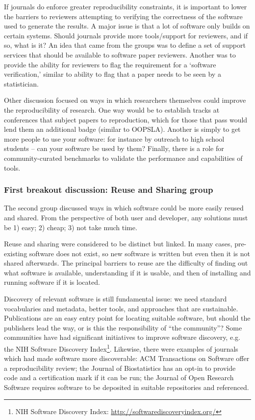 \documentclass[11pt, oneside]{amsart}
\begin{document}
If journals do enforce greater reproducibility constraints, it is important to
lower the barriers to reviewers attempting to verifying the correctness of the
software used to generate the results. A major issue is that a lot of software
only builds on certain systems. Should journals provide more tools/support for
reviewers, and if so, what is it? An idea that came from the groups was to
define a set of support services that should be available to software paper
reviewers. Another was to provide the ability for reviewers to flag the
requirement for a `software verification,' similar to ability to flag that a
paper needs to be seen by a statistician.

Other discussion focused on ways in which researchers themselves could improve
the reproducibility of research. One way would be to establish tracks at
conferences that subject papers to reproduction, which for those that pass would
lend them an additional badge (similar to OOPSLA). Another is simply to get more
people to use your software: for instance by outreach to high school students --
can your software be used by them? Finally, there is a role for
community-curated benchmarks to validate the performance and capabilities of
tools.

\subsubsection{First breakout discussion: Reuse and Sharing group}

The second group discussed ways in which software could be more easily reused
and shared. From the perspective of both user and developer, any solutions must
be 1) easy; 2) cheap; 3) not take much time.

Reuse and sharing were considered to be distinct but linked. In many cases,
pre-existing software does not exist, so new software is written but even then
it is not shared afterwards. The principal barriers to reuse are the difficulty
of finding out what software is available, understanding if it is usable, and
then of installing and running software if it is located.

Discovery of relevant software is still fundamental issue: we need standard
vocabularies and metadata, better tools, and approaches that are sustainable.
Publications are an easy entry point for locating suitable software, but should
the publishers lead the way, or is this the responsibility of ``the community''?
Some communities have had significant initiatives to improve software discovery,
e.g. the NIH Software Discovery Index\footnote{NIH Software Discovery Index:
\url{http://softwarediscoveryindex.org/}}. Likewise, there were examples of
journals which had made software more discoverable: ACM Transactions on Software
offer a reproducibility review; the Journal of Biostatistics has an opt-in to
provide code and a certification mark if it can be run; the Journal of Open
Research Software requires software to be deposited in suitable repositories and
referenced.
\end{document}
